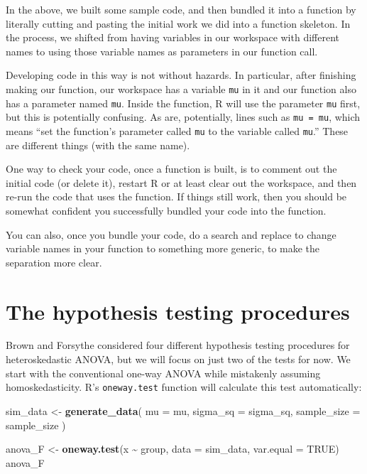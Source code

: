 \documentclass[
]{book}
\newenvironment{Shaded}{\begin{snugshade}}{\end{snugshade}}
\newcommand{\AttributeTok}[1]{\textcolor[rgb]{0.13,0.29,0.53}{#1}}
\newcommand{\ConstantTok}[1]{\textcolor[rgb]{0.56,0.35,0.01}{#1}}
\newcommand{\FunctionTok}[1]{\textcolor[rgb]{0.13,0.29,0.53}{\textbf{#1}}}
\newcommand{\NormalTok}[1]{#1}
\newcommand{\OtherTok}[1]{\textcolor[rgb]{0.56,0.35,0.01}{#1}}
\newcommand{\SpecialCharTok}[1]{\textcolor[rgb]{0.81,0.36,0.00}{\textbf{#1}}}
\begin{document}
In the above, we built some sample code, and then bundled it into a function by literally cutting and pasting the initial work we did into a function skeleton.
In the process, we shifted from having variables in our workspace with different names to using those variable names as parameters in our function call.

Developing code in this way is not without hazards.
In particular, after finishing making our function, our workspace has a variable \texttt{mu} in it and our function also has a parameter named \texttt{mu}.
Inside the function, R will use the parameter \texttt{mu} first, but this is potentially confusing.
As are, potentially, lines such as \texttt{mu\ =\ mu}, which means ``set the function's parameter called \texttt{mu} to the variable called \texttt{mu}.''
These are different things (with the same name).

One way to check your code, once a function is built, is to comment out the initial code (or delete it), restart R or at least clear out the workspace, and then re-run the code that uses the function.
If things still work, then you should be somewhat confident you successfully bundled your code into the function.

You can also, once you bundle your code, do a search and replace to change variable names in your function to something more generic, to make the separation more clear.

\section{The hypothesis testing procedures}\label{the-hypothesis-testing-procedures}

Brown and Forsythe considered four different hypothesis testing procedures for heteroskedastic ANOVA, but we will focus on just two of the tests for now.
We start with the conventional one-way ANOVA while mistakenly assuming homoskedasticity.
R's \texttt{oneway.test} function will calculate this test automatically:

\begin{Shaded}
\begin{Highlighting}[]
\NormalTok{sim\_data }\OtherTok{\textless{}{-}} \FunctionTok{generate\_data}\NormalTok{(}
  \AttributeTok{mu =}\NormalTok{ mu, }
  \AttributeTok{sigma\_sq =}\NormalTok{ sigma\_sq,}
  \AttributeTok{sample\_size =}\NormalTok{ sample\_size}
\NormalTok{)}

\NormalTok{anova\_F }\OtherTok{\textless{}{-}} \FunctionTok{oneway.test}\NormalTok{(x }\SpecialCharTok{\textasciitilde{}}\NormalTok{ group, }\AttributeTok{data =}\NormalTok{ sim\_data, }\AttributeTok{var.equal =} \ConstantTok{TRUE}\NormalTok{)}
\NormalTok{anova\_F}
\end{Highlighting}
\end{Shaded}
\end{document}
